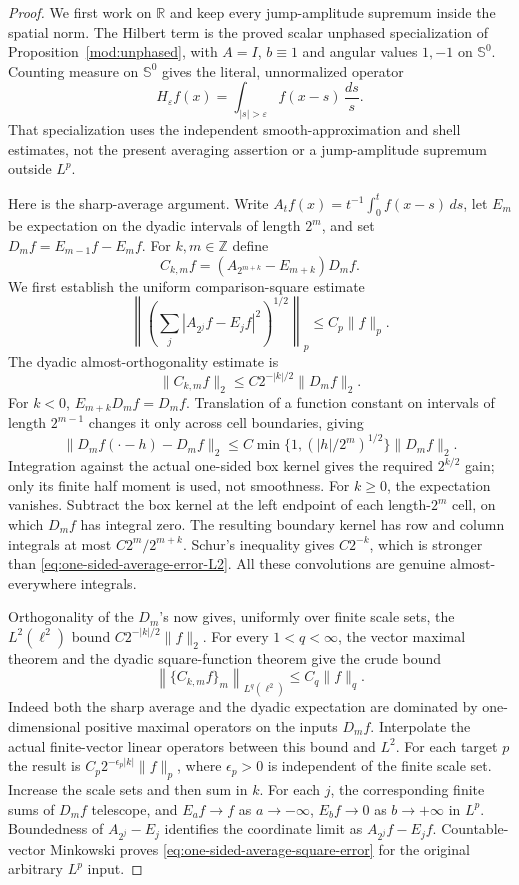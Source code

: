 \documentclass[11pt]{article}
\numberwithin{equation}{section}
\theoremstyle{remark}
\theoremstyle{definition}
\newcommand{\R}{\mathbb R}
\newcommand{\Sph}{\mathbb S}
\begin{document}
\begin{proof}
We first work on $\R$ and keep every jump-amplitude supremum inside
the spatial norm.  The Hilbert term is the proved scalar unphased
specialization of Proposition~\ref{mod:unphased}, with $A=I$,
$b\equiv1$ and angular values $1,-1$ on $\Sph^0$.  Counting measure
on $\Sph^0$ gives the literal, unnormalized operator
\[
 H_\varepsilon f(x)=\int_{|s|>\varepsilon}f(x-s)\,\frac{ds}{s}.
\]
That specialization uses the independent smooth-approximation and
shell estimates, not the present averaging assertion or a jump-amplitude
supremum outside $L^p$.

Here is the sharp-average argument.  Write
$A_tf(x)=t^{-1}\int_0^tf(x-s)\,ds$, let $E_m$ be expectation on the
dyadic intervals of length $2^m$, and set
$D_mf=E_{m-1}f-E_mf$.  For $k,m\in\mathbb Z$ define
\[
 C_{k,m}f=(A_{2^{m+k}}-E_{m+k})D_mf.
\]
We first establish the uniform comparison-square estimate
\begin{equation}\label{eq:one-sided-average-square-error}
 \left\|\left(\sum_j|A_{2^j}f-E_jf|^2\right)^{1/2}\right\|_p
 \le C_p\|f\|_p.
\end{equation}
The dyadic almost-orthogonality estimate is
\begin{equation}\label{eq:one-sided-average-error-L2}
 \|C_{k,m}f\|_2\le C2^{-|k|/2}\|D_mf\|_2.
\end{equation}
For $k<0$, $E_{m+k}D_mf=D_mf$.  Translation of a function constant
on intervals of length $2^{m-1}$ changes it only across cell boundaries,
giving
\[
 \|D_mf(\cdot-h)-D_mf\|_2
 \le C\min\{1,(|h|/2^m)^{1/2}\}\|D_mf\|_2.
\]
Integration against the actual one-sided box kernel gives the required
$2^{k/2}$ gain; only its finite half moment is used, not smoothness.
For $k\ge0$, the expectation vanishes.  Subtract the box kernel at the
left endpoint of each length-$2^m$ cell, on which $D_mf$ has integral
zero.  The resulting boundary kernel has row and column integrals at
most $C2^m/2^{m+k}$.  Schur's inequality gives $C2^{-k}$, which is
stronger than \eqref{eq:one-sided-average-error-L2}.
All these convolutions are genuine almost-everywhere integrals.

Orthogonality of the $D_m$'s now gives, uniformly over finite scale
sets, the $L^2(\ell^2)$ bound $C2^{-|k|/2}\|f\|_2$.
For every $1<q<\infty$, the vector maximal theorem and the dyadic
square-function theorem give the crude bound
\[
 \left\|\{C_{k,m}f\}_m\right\|_{L^q(\ell^2)}\le C_q\|f\|_q.
\]
Indeed both the sharp average and the dyadic expectation are dominated
by one-dimensional positive maximal operators on the inputs $D_mf$.
Interpolate the actual finite-vector linear operators between this
bound and $L^2$.  For each target $p$ the result is
$C_p2^{-\epsilon_p|k|}\|f\|_p$, where $\epsilon_p>0$ is independent
of the finite scale set.  Increase the scale sets and then sum in $k$.
For each $j$, the corresponding finite sums of $D_mf$ telescope, and
$E_af\to f$ as $a\to-\infty$, $E_bf\to0$ as $b\to+\infty$ in
$L^p$.  Boundedness of $A_{2^j}-E_j$ identifies the coordinate limit
as $A_{2^j}f-E_jf$.  Countable-vector Minkowski proves
\eqref{eq:one-sided-average-square-error} for the original arbitrary
$L^p$ input.


\end{proof}
\end{document}
